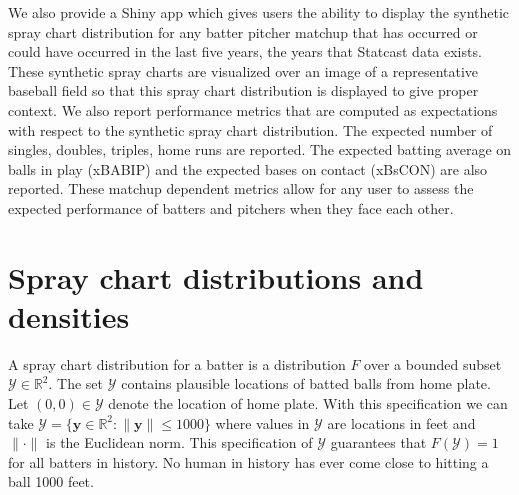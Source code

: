 \documentclass[12pt]{article}
\newcommand{\R}{\mathbb{R}}
\newcommand{\Y}{\mathcal{Y}}
\newcommand{\y}{\textbf{y}}
\begin{document}
We also provide a Shiny app which gives users the ability to display the synthetic spray chart distribution for any batter pitcher matchup that has occurred or could have occurred in the last five years, the years that Statcast data exists. These synthetic spray charts are visualized over an image of a representative baseball field so that this spray chart distribution is displayed to give proper context. We also report performance metrics that are computed as expectations with respect to the synthetic spray chart distribution. The expected number of singles, doubles, triples, home runs are reported. The expected batting average on balls in play (xBABIP) and the expected bases on contact (xBsCON) are also reported. These matchup dependent metrics allow for any user to assess the expected performance of batters and pitchers when they face each other. 




\section{Spray chart distributions and densities}

A spray chart distribution for a batter is a distribution $F$ over a bounded subset $\Y \in \R^2$. The set $\Y$ contains plausible locations of batted balls from home plate. Let $(0,0) \in \Y$ denote the location of home plate. With this specification we can take $\Y = \{\y \in \R^2: \|\y\| \leq 1000\}$ where values in $\Y$ are locations in feet and $\|\cdot\|$ is the Euclidean norm. This specification of $\Y$ guarantees that $F(\Y) = 1$ for all batters in history. No human in history has ever come close to hitting a ball 1000 feet.
\end{document}
